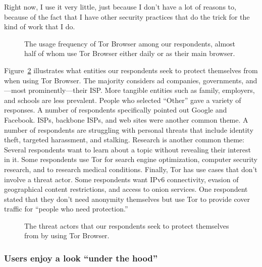 \begin{displayquote}[P07]
Right now, I use it very little, just because I don't have a lot of reasons to,
because of the fact that I have other security practices that do the trick for
the kind of work that I do.
\end{displayquote}

\begin{figure}[t]
    \centering
    
    \caption{The usage frequency of Tor Browser among our respondents, almost
    half of whom use Tor Browser either daily or as their main browser.}
    \label{fig:tor-usage}
\end{figure}

Figure~\ref{fig:tor-threats} illustrates what entities our respondents seek to
protect themselves from when using Tor Browser.  The majority considers ad
companies, governments, and---most prominently---their ISP.  More tangible
entities such as family, employers, and schools are less prevalent.  People who
selected ``Other'' gave a variety of responses.  A number of respondents
specifically pointed out Google and Facebook.  ISPs, backbone ISPs, and web
sites were another common theme.  A number of respondents are struggling with
personal threats that include identity theft, targeted harassment, and stalking.
Research is another common theme: Several respondents want to learn about a
topic without revealing their interest in it.  Some respondents use Tor for
search engine optimization, computer security research, and to research medical
conditions.  Finally, Tor has use cases that don't involve a threat actor.  Some
respondents want IPv6 connectivity, evasion of geographical content
restrictions, and access to onion services.  One respondent stated that they
don't need anonymity themselves but use Tor to provide cover traffic for
``people who need protection.''

\begin{figure}[t]
    \centering
    
    \caption{The threat actors that our respondents seek to protect themselves
    from by using Tor Browser.}
    \label{fig:tor-threats}
\end{figure}

\subsubsection{Users enjoy a look ``under the hood''}

